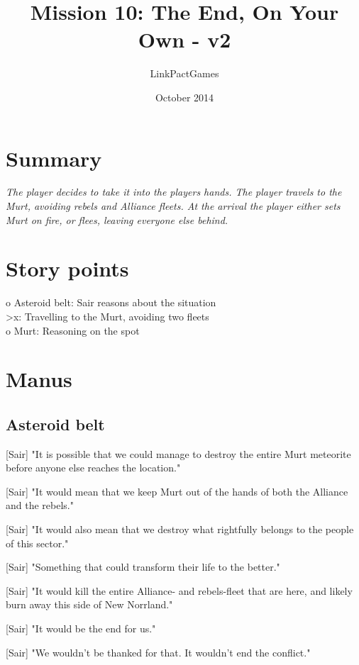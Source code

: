 \documentclass[a4paper,12pt]{article}
\begin{document}
\title{Mission 10: The End, On Your Own - v2}
\author{LinkPactGames}
\date{October 2014}
\maketitle

\section{Summary}

\textit{The player decides to take it into the players hands. The player travels to the Murt, avoiding
rebels and Alliance fleets. At the arrival the player either sets Murt on fire, or flees, leaving everyone else behind.}

\section{Story points}

o Asteroid belt: Sair reasons about the situation\\
\textgreater x: Travelling to the Murt, avoiding two fleets\\
o Murt: Reasoning on the spot

\section{Manus}

\subsection{Asteroid belt}

[Sair] "It is possible that we could manage to destroy the entire Murt meteorite before anyone else
reaches the location."

[Sair] "It would mean that we keep Murt out of the hands of both the Alliance and the rebels."

[Sair] "It would also mean that we destroy what rightfully belongs to the people of this sector."

[Sair] "Something that could transform their life to the better."

[Sair] "It would kill the entire Alliance- and rebels-fleet that are here, and likely burn away this side of New Norrland."

[Sair] "It would be the end for us."

[Sair] "We wouldn't be thanked for that. It wouldn't end the conflict." 
\end{document}

